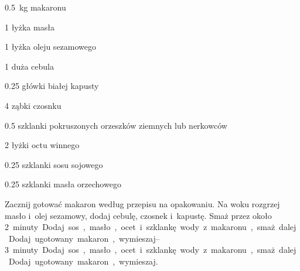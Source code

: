 \documentclass[../kucharek.tex]{subfiles}
\begin{document}

\begin{Ingred}
    \item \qty{.5}{\kilo\gram} makaronu
    \item \num{1} łyżka masła
    \item \num{1} łyżka oleju sezamowego
    \item \num{1} duża cebula
    \item \num{.25} główki białej kapusty
    \item \num{4} ząbki czosnku
    \item \num{.5} szklanki pokruszonych orzeszków ziemnych lub nerkowców
    \item \num{2} łyżki octu winnego
    \item \num{.25} szklanki sosu sojowego
    \item \num{.25} szklanki masła orzechowego
\end{Ingred}

Zacznij gotować makaron według przepisu na opakowaniu. Na woku rozgrzej masło
i~olej sezamowy, dodaj cebulę, czosnek i~kapustę. Smaż przez około
\qtyrange{2}{3} minuty. Dodaj sos, masło, ocet i~szklankę wody z~makaronu, smaż
dalej. Dodaj ugotowany makaron, wymieszaj.
\end{document}
